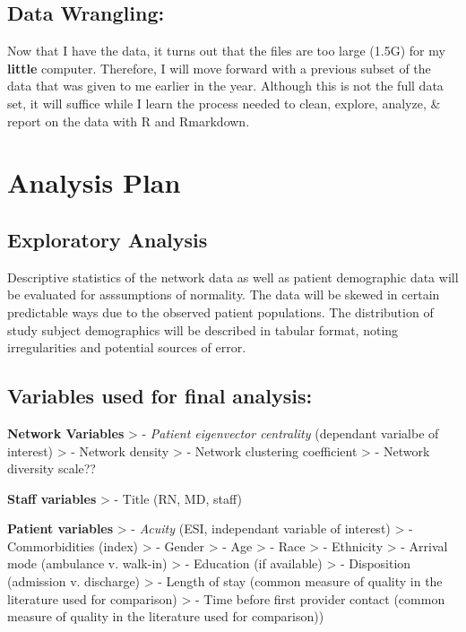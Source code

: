 \documentclass[]{elsarticle} %
\begin{document}
\subsection{Data Wrangling:}\label{data-wrangling}

Now that I have the data, it turns out that the files are too large
(1.5G) for my \textbf{little} computer. Therefore, I will move forward
with a previous subset of the data that was given to me earlier in the
year. Although this is not the full data set, it will suffice while I
learn the process needed to clean, explore, analyze, \& report on the
data with R and Rmarkdown.

\section{Analysis Plan}\label{analysis-plan}

\subsection{Exploratory Analysis}\label{exploratory-analysis}

Descriptive statistics of the network data as well as patient
demographic data will be evaluated for asssumptions of normality. The
data will be skewed in certain predictable ways due to the observed
patient populations. The distribution of study subject demographics will
be described in tabular format, noting irregularities and potential
sources of error.

\subsection{Variables used for final
analysis:}\label{variables-used-for-final-analysis}

\textbf{Network Variables} \textgreater{} - \emph{Patient eigenvector
centrality} (dependant varialbe of interest) \textgreater{} - Network
density \textgreater{} - Network clustering coefficient \textgreater{} -
Network diversity scale??

\textbf{Staff variables} \textgreater{} - Title (RN, MD, staff)

\textbf{Patient variables} \textgreater{} - \emph{Acuity} (ESI,
independant variable of interest) \textgreater{} - Commorbidities
(index) \textgreater{} - Gender \textgreater{} - Age \textgreater{} -
Race \textgreater{} - Ethnicity \textgreater{} - Arrival mode (ambulance
v. walk-in) \textgreater{} - Education (if available) \textgreater{} -
Disposition (admission v. discharge) \textgreater{} - Length of stay
(common measure of quality in the literature used for comparison)
\textgreater{} - Time before first provider contact (common measure of
quality in the literature used for comparison))
\end{document}
